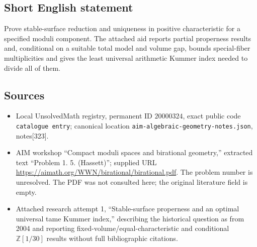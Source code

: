 \documentclass[11pt]{article}
\newcommand{\Z}{\mathbb{Z}}
\begin{document}
\subsection{Short English statement}
Prove stable-surface reduction and uniqueness in positive characteristic for a specified moduli component. The attached aid reports partial properness results and, conditional on a suitable total model and volume gap, bounds special-fiber multiplicities and gives the least universal arithmetic Kummer index needed to divide all of them.
\subsection{Sources}
\begin{itemize}
\item Local UnsolvedMath registry, permanent ID \(20000324\), exact public code \texttt{catalogue entry}; canonical location \texttt{aim-algebraic-geometry-notes.json}, notes[323].
\item AIM workshop ``Compact moduli spaces and birational geometry,'' extracted text ``Problem 1. 5. (Hassett)''; supplied URL \url{https://aimath.org/WWN/birational/birational.pdf}. The problem number is unresolved. The PDF was not consulted here; the original literature field is empty.
\item Attached research attempt 1, ``Stable-surface properness and an optimal universal tame Kummer index,'' describing the historical question as from 2004 and reporting fixed-volume/equal-characteristic and conditional \(\Z[1/30]\) results without full bibliographic citations.
\end{itemize}
\end{document}
